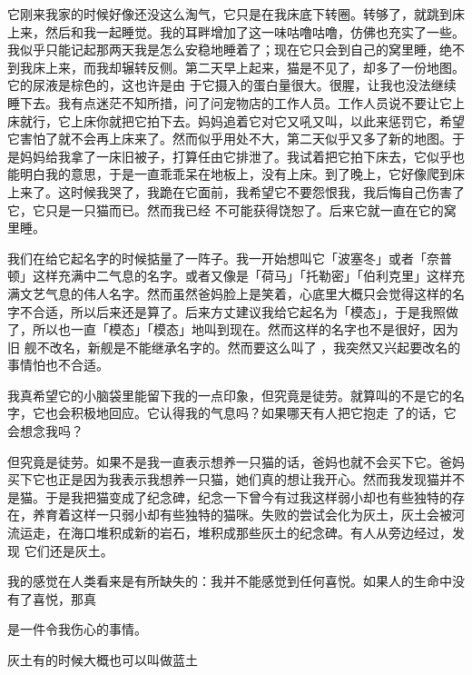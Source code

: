 \documentclass{article}
\begin{document}
它刚来我家的时候好像还没这么淘气，它只是在我床底下转圈。转够了，就跳到床上来，然后和我一起睡觉。我的耳畔增加了这一味咕噜咕噜，仿佛也充实了一些。我似乎只能记起那两天我是怎么安稳地睡着了；现在它只会到自己的窝里睡，绝不到我床上来，而我却辗转反侧。第二天早上起来，猫是不见了，却多了一份地图。它的尿液是棕色的，这也许是由
\newpage
于它摄入的蛋白量很大。很腥，让我也没法继续睡下去。我有点迷茫不知所措，问了问宠物店的工作人员。工作人员说不要让它上床就行，它上床你就把它拍下去。妈妈追着它对它又吼又叫，以此来惩罚它，希望它害怕了就不会再上床来了。然而似乎用处不大，第二天似乎又多了新的地图。于是妈妈给我拿了一床旧被子，打算任由它排泄了。我试着把它拍下床去，它似乎也能明白我的意思，于是一直乖乖呆在地板上，没有上床。到了晚上，它好像爬到床上来了。这时候我哭了，我跪在它面前，我希望它不要怨恨我，我后悔自己伤害了它，它只是一只猫而已。然而我已经
不可能获得饶恕了。后来它就一直在它的窝里睡。 

我们在给它起名字的时候掂量了一阵子。我一开始想叫它「波塞冬」或者「奈普顿」这样充满中二气息的名字。或者又像是「荷马」「托勒密」「伯利克里」这样充满文艺气息的伟人名字。然而虽然爸妈脸上是笑着，心底里大概只会觉得这样的名字不合适，所以后来还是算了。后来方丈建议我给它起名为「模态」，于是我照做了，所以也一直「模态」「模态」地叫到现在。然而这样的名字也不是很好，因为旧
\newpage
舰不改名，新舰是不能继承名字的。然而要这么叫了
，我突然又兴起要改名的事情怕也不合适。 

我真希望它的小脑袋里能留下我的一点印象，但究竟是徒劳。就算叫的不是它的名字，它也会积极地回应。它认得我的气息吗？如果哪天有人把它抱走
了的话，它会想念我吗？ 

但究竟是徒劳。如果不是我一直表示想养一只猫的话，爸妈也就不会买下它。爸妈买下它也正是因为我表示我想养一只猫，她们真的想让我开心。然而我发现猫并不是猫。于是我把猫变成了纪念碑，纪念一下曾今有过我这样弱小却也有些独特的存在，养育着这样一只弱小却有些独特的猫咪。失败的尝试会化为灰土，灰土会被河流运走，在海口堆积成新的岩石，堆积成那些灰土的纪念碑。有人从旁边经过，发现
它们还是灰土。 

我的感觉在人类看来是有所缺失的：我并不能感觉到任何喜悦。如果人的生命中没有了喜悦，那真

\newpage
是一件令我伤心的事情。 \par 灰土有的时候大概也可以叫做蓝土
\end{document}
